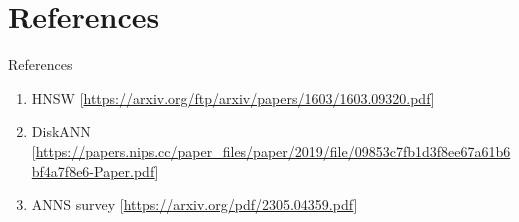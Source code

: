 \section{References}

\begin{frame}{References}
    \begin{enumerate}
        \item HNSW [\href{https://arxiv.org/ftp/arxiv/papers/1603/1603.09320.pdf}{https://arxiv.org/ftp/arxiv/papers/1603/1603.09320.pdf}]
        \item DiskANN [\href{https://papers.nips.cc/paper\_files/paper/2019/file/09853c7fb1d3f8ee67a61b6bf4a7f8e6-Paper.pdf}{https://papers.nips.cc/paper\_files/paper/2019/file/09853c7fb1d3f8ee67a61b6bf4a7f8e6-Paper.pdf}]
        \item ANNS survey [\href{https://arxiv.org/pdf/2305.04359.pdf}{https://arxiv.org/pdf/2305.04359.pdf}]
    \end{enumerate}
\end{frame}
